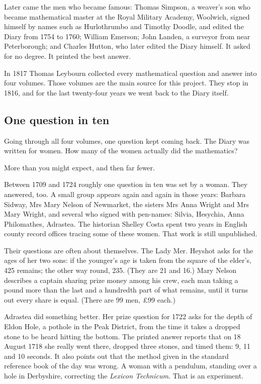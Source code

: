 \documentclass[11pt,a4paper]{article}
\begin{document}
Later came the men who became famous: Thomas Simpson, a weaver's son who
became mathematical master at the Royal Military Academy, Woolwich,
signed himself by names such as Hurlothrumbo and Timothy Doodle, and
edited the Diary from 1754 to 1760; William Emerson; John Landen, a
surveyor from near Peterborough; and Charles Hutton, who later edited
the Diary himself. It asked for no degree. It printed the best answer.

In 1817 Thomas Leybourn collected every mathematical question and answer
into four volumes. Those volumes are the main source for this project.
They stop in 1816, and for the last twenty-four years we went back to
the Diary itself.

\hypertarget{one-question-in-ten}{%
\subsection{One question in ten}\label{one-question-in-ten}}

Going through all four volumes, one question kept coming back. The Diary
was written for women. How many of the women actually did the
mathematics?

More than you might expect, and then far fewer.

Between 1709 and 1724 roughly one question in ten was set by a woman.
They answered, too. A small group appears again and again in those
years: Barbara Sidway, Mrs Mary Nelson of Newmarket, the sisters Mrs
Anna Wright and Mrs Mary Wright, and several who signed with pen-names:
Silvia, Hesychia, Anna Philomathes, Adrastea. The historian Shelley
Costa spent two years in English county record offices tracing some of
these women. That work is still unpublished.

Their questions are often about themselves. The Lady Mer. Heyshot asks
for the ages of her two sons: if the younger's age is taken from the
square of the elder's, 425 remains; the other way round, 235. (They are
21 and 16.) Mary Nelson describes a captain sharing prize money among
his crew, each man taking a pound more than the last and a hundredth
part of what remains, until it turns out every share is equal. (There
are 99 men, £99 each.)

Adrastea did something better. Her prize question for 1722 asks for the
depth of Eldon Hole, a pothole in the Peak District, from the time it
takes a dropped stone to be heard hitting the bottom. The printed answer
reports that on 18 August 1718 she really went there, dropped three
stones, and timed them: 9, 11 and 10 seconds. It also points out that
the method given in the standard reference book of the day was wrong. A
woman with a pendulum, standing over a hole in Derbyshire, correcting
the \emph{Lexicon Technicum}. That is an experiment.
\end{document}
